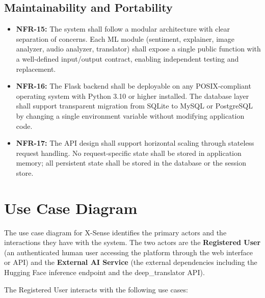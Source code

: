 \documentclass[12pt, a4paper]{report}
\begin{document}
\subsection{Maintainability and Portability}

\begin{itemize}[noitemsep, leftmargin=2em]
    \item \textbf{NFR-15:} The system shall follow a modular architecture with clear separation of concerns. Each ML module (sentiment, explainer, image analyzer, audio analyzer, translator) shall expose a single public function with a well-defined input/output contract, enabling independent testing and replacement.
    \item \textbf{NFR-16:} The Flask backend shall be deployable on any POSIX-compliant operating system with Python 3.10 or higher installed. The database layer shall support transparent migration from SQLite to MySQL or PostgreSQL by changing a single environment variable without modifying application code.
    \item \textbf{NFR-17:} The API design shall support horizontal scaling through stateless request handling. No request-specific state shall be stored in application memory; all persistent state shall be stored in the database or the session store.
\end{itemize}

\section{Use Case Diagram}

The use case diagram for X-Sense identifies the primary actors and the interactions they have with the system. The two actors are the \textbf{Registered User} (an authenticated human user accessing the platform through the web interface or API) and the \textbf{External AI Service} (the external dependencies including the Hugging Face inference endpoint and the deep\_translator API).

The Registered User interacts with the following use cases:
\end{document}
